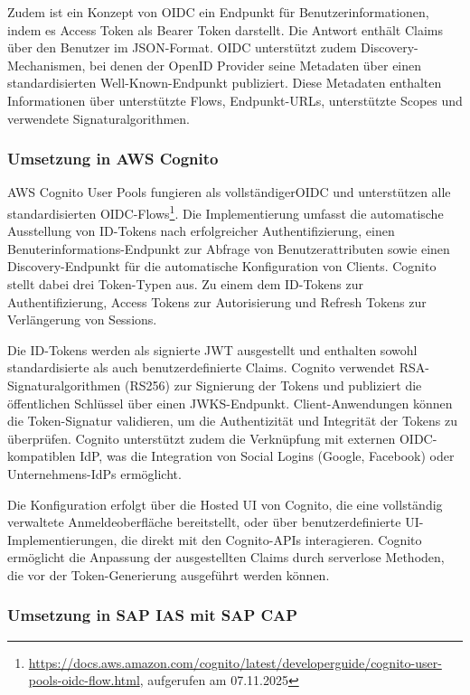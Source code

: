Zudem ist ein Konzept von \ac{OIDC} ein Endpunkt für Benutzerinformationen, indem es Access Token als Bearer Token darstellt. Die Antwort enthält Claims über den Benutzer im JSON-Format. \ac{OIDC} unterstützt zudem Discovery-Mechanismen, bei denen der OpenID Provider seine Metadaten über einen standardisierten Well-Known-Endpunkt publiziert. Diese Metadaten enthalten Informationen über unterstützte Flows, Endpunkt-URLs, unterstützte Scopes und verwendete Signaturalgorithmen.

\subsubsection{Umsetzung in AWS Cognito}

AWS Cognito User Pools fungieren als vollständiger\ac{OIDC} und unterstützen alle standardisierten \ac{OIDC}-Flows\footnote{\url{https://docs.aws.amazon.com/cognito/latest/developerguide/cognito-user-pools-oidc-flow.html}, aufgerufen am 07.11.2025}. Die Implementierung umfasst die automatische Ausstellung von ID-Tokens nach erfolgreicher Authentifizierung, einen Benuterinformations-Endpunkt zur Abfrage von Benutzerattributen sowie einen Discovery-Endpunkt für die automatische Konfiguration von Clients. Cognito stellt dabei drei Token-Typen aus. Zu einem dem ID-Tokens zur Authentifizierung, Access Tokens zur Autorisierung und Refresh Tokens zur Verlängerung von Sessions.

Die ID-Tokens werden als signierte \ac{JWT} ausgestellt und enthalten sowohl standardisierte als auch benutzerdefinierte Claims. Cognito verwendet RSA-Signaturalgorithmen (RS256) zur Signierung der Tokens und publiziert die öffentlichen Schlüssel über einen \ac{JWKS}-Endpunkt. Client-Anwendungen können die Token-Signatur validieren, um die Authentizität und Integrität der Tokens zu überprüfen. Cognito unterstützt zudem die Verknüpfung mit externen \ac{OIDC}-kompatiblen \ac{IdP}, was die Integration von Social Logins (Google, Facebook) oder Unternehmens-IdPs ermöglicht.

Die Konfiguration erfolgt über die Hosted UI von Cognito, die eine vollständig verwaltete Anmeldeoberfläche bereitstellt, oder über benutzerdefinierte UI-Implementierungen, die direkt mit den Cognito-APIs interagieren. Cognito ermöglicht die Anpassung der ausgestellten Claims durch serverlose Methoden, die vor der Token-Generierung ausgeführt werden können.

\subsubsection{Umsetzung in SAP IAS mit SAP CAP}

